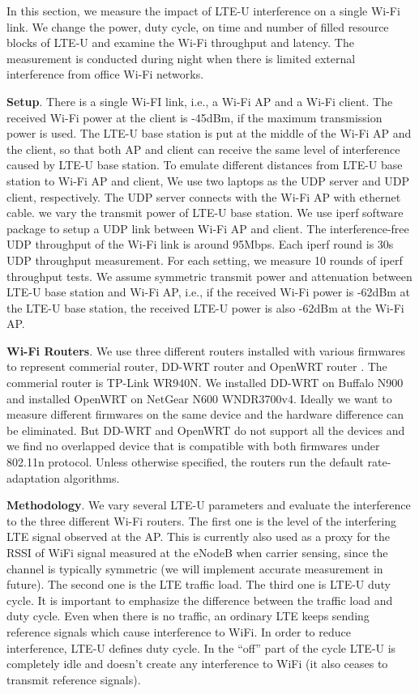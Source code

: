 

In this section, we measure the impact of LTE-U interference
on a single Wi-Fi link. 
We change the power, duty cycle, on time
and number of filled resource blocks of LTE-U and 
examine the Wi-Fi throughput and latency. 
The measurement is conducted during night when there
is limited external interference from office 
Wi-Fi networks. 


\textbf{Setup}. There is a single Wi-FI link, i.e., a  Wi-Fi AP and a Wi-Fi client. 
The received Wi-Fi power at the 
client is -45dBm, if the maximum transmission power is used. 
The LTE-U base station is put at the middle of the Wi-Fi AP
and the client, so that both AP and client can receive the same level of interference
caused by LTE-U base station. 
To emulate different distances from LTE-U base station to Wi-Fi AP and client,
We use two laptops as the UDP server and UDP client, respectively. 
The UDP server connects with the Wi-Fi AP with ethernet cable. 
we vary the transmit power of LTE-U base station. 
We use iperf software package to setup a UDP link between Wi-Fi AP and client. 
The interference-free UDP throughput of the Wi-Fi link is around 95Mbps.
Each iperf round is 30s UDP throughput measurement. 
For each setting, we measure 10 rounds of iperf throughput tests. 
We assume symmetric transmit power and attenuation between LTE-U base station
and Wi-Fi AP, i.e., if the received Wi-Fi power is -62dBm at the 
LTE-U base station, the received LTE-U power is also -62dBm at the Wi-Fi AP. 



\textbf{Wi-Fi Routers}. 
We use three different routers installed with various firmwares to represent
commerial router, DD-WRT router \cite{ddwrt} and OpenWRT router \cite{openwrt}. 
The commerial router is TP-Link WR940N. 
We installed DD-WRT on Buffalo N900 and 
installed OpenWRT on NetGear N600 WNDR3700v4.
Ideally we want to measure different firmwares on the same 
device and the hardware difference can be eliminated. 
But DD-WRT and OpenWRT do not support all the devices
and we find no overlapped device that is 
compatible with both firmwares under 802.11n protocol.
Unless otherwise specified, the routers run the default rate-adaptation algorithms. 



\textbf{Methodology}.
We vary several LTE-U parameters and evaluate the interference
to the three different Wi-Fi routers. 
The first one is the level of the interfering LTE signal observed at the AP. 
This is currently also used as a proxy for the RSSI of WiFi signal measured at the eNodeB when carrier sensing, 
since the channel is typically symmetric (we will implement accurate measurement in future). The second one is the LTE traffic load. The third one is LTE-U duty cycle. 
It is important to emphasize the difference between the traffic load and duty cycle. 
Even when there is no traffic, an ordinary LTE keeps sending reference signals which cause interference to WiFi. 
In order to reduce interference, LTE-U defines duty cycle. 
In the ``off'' part of the cycle LTE-U is completely idle 
and doesn't create any interference to WiFi (it also ceases to transmit reference signals).



